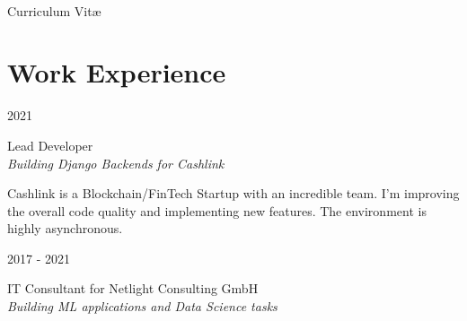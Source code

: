 \documentclass[a4paper,10pt]{article} %
\begin{document}
\color{text1} %


\par{\\ %
{\Huge \color{headings} Curriculum {Vit\ae}\\[15pt]\par}


\begin{minipage}[t]{0.5\textwidth}
\vspace{0pt} %


\section{Work Experience}

{\raggedleft\textsc{2021}\par}

{\raggedright\large Lead Developer\\
\textit{Building Django Backends for Cashlink}\\[5pt]}

\normalsize{Cashlink is a Blockchain/FinTech Startup with an incredible team.
I'm improving the overall code quality and implementing new features. The 
environment is highly asynchronous.}\\


{\raggedleft\textsc{2017 - 2021}\par}

{\raggedright\large IT Consultant for Netlight Consulting GmbH\\
\textit{Building ML applications and Data Science tasks}\\[5pt]}


\end{minipage}}
\end{document}
